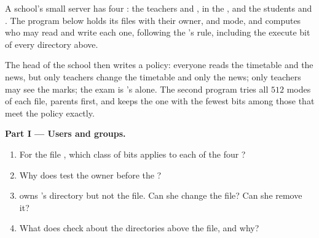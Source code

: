 \begin{problem}\label{pb:g11:os-and-command-line:1}
A school's small server has four : the teachers  and , in the  , and the
students  and . The program below holds its files with their owner,  and mode, and computes
who may read and write each one, following the 's rule, including the execute bit of every directory above.

\label{lst:g11:os-and-command-line:timetable}

\label{out:g11:os-and-command-line:timetable}

The head of the school then writes a policy: everyone reads the timetable and the news, but only teachers change the
timetable and only  the news; only teachers may see the marks; the exam is 's alone. The second
program tries all $512$ modes of each file, parents first, and keeps the one with the fewest bits among those that
meet the policy exactly.

\label{lst:g11:os-and-command-line:policy}

\label{out:g11:os-and-command-line:policy}

\medskip\noindent\textbf{Part I --- Users and groups.}
\begin{enumerate}
  \item For the file , which class of bits applies to each of the four ?
  \item Why does  test the owner before the ?
  \item {} owns 's directory but not the file. Can she change the file? Can she remove
    it?
  \item What does  check about the directories above the file, and why?
\end{enumerate}


\end{problem}
